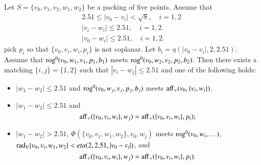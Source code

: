 \begin{tarskidata}
\begin{tarski}

\begin{lemma}
Let $S=\{v_0,v_1,v_2,w_1,w_2\}$ be a packing of five points.
  Assume that
  $$\begin{array}{lll}
  2.51 \le |v_0-v_i| < \sqrt8,\quad i=1,2\\
  |v_i-w_i|\le 2.51, \quad i=1,2.\\
  |v_0-w_i|\le 2.51,\quad i=1,2.
  \end{array}
  $$
pick $p_i$ so that $\{v_0,v_i,w_i,p_i\}$ is not coplanar.
Let $b_i=\eta(|v_0-v_i|,2,2.51)$.  
%
Assume that ${\operatorname{rog}}^0(v_0,w_1,v_1,p_1,b_1)$ meets
  ${\operatorname{rog}}^0(v_0,w_2,v_2,p_2,b_2)$.
Then there exists a matching $\{i,j\}=\{1,2\}$ 
such that $|v_i-w_j|\le 2.51$ and one of the following holds:
\begin{itemize}
     \item $|w_1-w_2|\le 2.51$ and ${\operatorname{rog}}^0(v_0,w_j,v_j,p_j,b_j)$ meets
           ${\operatorname{aff}}_+(v_0,\{v_i,w_i\})$.
       \item $|w_1-w_2|\le 2.51$ and 
     $$
     {\operatorname{aff}}_+(\{v_0,v_i,w_i\},w_j) = {\operatorname{aff}}_+(\{v_0,v_i,w_i\},p_i);
     $$
              \item $|w_1-w_2|> 2.51$, $\Phi(\{v_0,v_1,w_1,w_2\},v_0,w_j)$ meets
                ${\operatorname{rog}}^0(v_0,w_i,\ldots)$, 
             $\operatorname{rad}_V\{v_0,v_i,w_1,w_2\}<eta(2,2.51,|v_0-v_i|)$, and
    $$
     {\operatorname{aff}}_+(\{v_0,v_i,w_i\},w_j) = {\operatorname{aff}}_+(\{v_0,v_i,w_i\},p_i).
     $$
\end{itemize}
\end{lemma}


\end{tarski}
\end{tarskidata}

